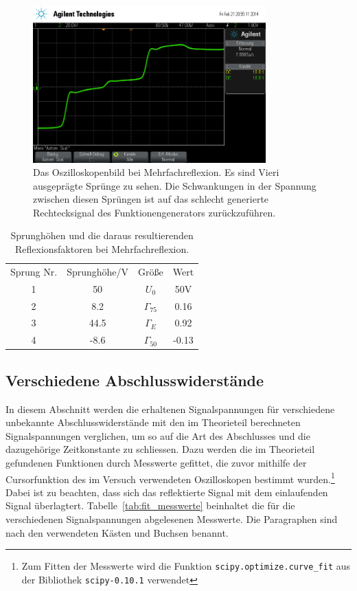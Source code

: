 \begin{figure}[]
  \centering
  \includegraphics[width=0.8\textwidth]{reflex.png}
  \caption{Das Oszilloskopenbild bei Mehrfachreflexion. Es sind Vieri
    ausgeprägte Sprünge zu sehen. Die Schwankungen in der Spannung
    zwischen diesen Sprüngen ist auf das schlecht generierte
    Rechtecksignal des Funktionengenerators zurückzuführen.}
  \label{fig:mehrfachreflex}
\end{figure}
%
\begin{table}[h]
  \centering
  \begin{tabular}{SSSS}
    \toprule
    {Sprung Nr.}&{Sprunghöhe/}\si{\volt}&
    {Größe}&{Wert}\\
    \cmidrule(r){1-2} \cmidrule(l){3-4}
    1&50&{$U_0$}&50\si{\volt}\\
    2&8.2&{$\Gamma_{75}$}&0.16\\
    3&44.5&{$\Gamma_{E}$}&0.92\\
    4&-8.6&{$\Gamma_{50}$}&-0.13\\
    \bottomrule
  \end{tabular}
  \caption{Sprunghöhen und die daraus resultierenden 
    Reflexionsfaktoren bei Mehrfachreflexion.}
  \label{tab:mehrfachreflex}
\end{table}
%
\FloatBarrier
%
\subsection{Verschiedene Abschlusswiderstände}
%
In diesem Abschnitt werden die erhaltenen Signalspannungen für
verschiedene unbekannte Abschlusswiderstände mit den im Theorieteil
berechneten Signalspannungen verglichen, um so auf die Art des
Abschlusses und die dazugehörige Zeitkonstante zu schliessen.  Dazu
werden die im Theorieteil gefundenen Funktionen durch Messwerte
gefittet, die zuvor mithilfe der Cursorfunktion des im Versuch
verwendeten Oszilloskopen bestimmt wurden.\footnote{Zum Fitten der
  Messwerte wird die Funktion \texttt{scipy.optimize.curve\_fit} aus der
  Bibliothek \texttt{scipy-0.10.1} verwendet} Dabei ist zu beachten,
dass sich das reflektierte Signal mit dem einlaufenden Signal
überlagtert.  Tabelle~\ref{tab:fit_messwerte} beinhaltet die für die
verschiedenen Signalspannungen abgelesenen Messwerte.  Die Paragraphen
sind nach den verwendeten Kästen und Buchsen benannt.

